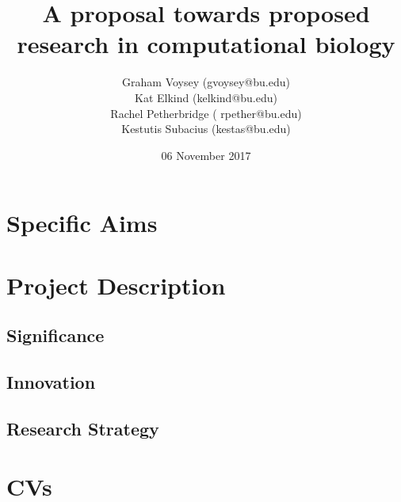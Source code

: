 \documentclass{article}
\begin{document}
\title{A proposal towards proposed research in computational biology}
\date{06 November 2017}
\author{Graham Voysey (gvoysey@bu.edu)\\Kat Elkind (kelkind@bu.edu)\\Rachel Petherbridge (
    rpether@bu.edu)\\Kestutis Subacius (kestas@bu.edu)}
\maketitle
\section{Specific Aims}

\section{Project Description}

	\subsection{Significance}

	\subsection{Innovation}

	\subsection{Research Strategy}

\section{CVs}

% 
% 
% 
\end{document}
